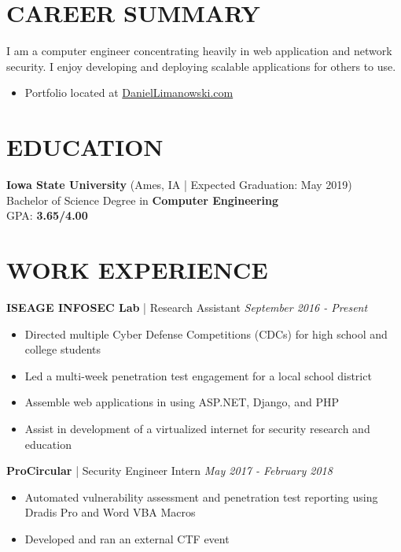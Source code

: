 \documentclass[line]{res}
\begin{document}
\address{(630) 450-0012\\dlimanow@iastate.edu\\Ames, Iowa}

\begin{resume}
\section{CAREER SUMMARY}
I am a computer engineer concentrating heavily in web application and network security. I enjoy developing and deploying scalable applications for others to use.
\begin{itemize}
	\item Portfolio located at \href{https://DanielLimanowski.com/}{DanielLimanowski.com}
\end{itemize}

\section{EDUCATION}
\textbf{Iowa State University} (Ames, IA | Expected Graduation: May 2019)\\
Bachelor of Science Degree in \textbf{Computer Engineering}\\
GPA: \textbf{3.65/4.00}

\section{WORK EXPERIENCE}
\textbf{ISEAGE INFOSEC Lab} | Research Assistant \hfill \textit{September 2016 - Present}
\begin{itemize}
	\item Directed multiple Cyber Defense Competitions (CDCs) for high school and college students
	\item Led a multi-week penetration test engagement for a local school district
	\item Assemble web applications in using ASP.NET, Django, and PHP
	\item Assist in development of a virtualized internet for security research and education
\end{itemize}

\textbf{ProCircular} | Security Engineer Intern \hfill \textit{May 2017 - February 2018}
\begin{itemize}
	\item Automated vulnerability assessment and penetration test reporting using Dradis Pro and Word VBA Macros
	\item Developed and ran an external CTF event
\end{itemize}


\end{resume}
\end{document}
